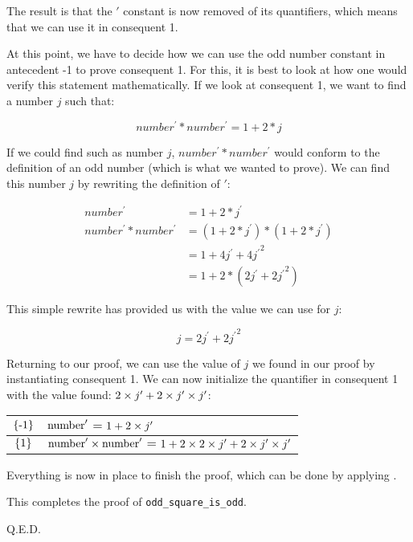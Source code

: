 \vspace{0.1in}

The result is that the {{\('\)}} constant is now removed of its quantifiers, which means that we can use it in consequent 1.\emptyline

At this point, we have to decide how we can use the odd number constant in antecedent -1 to prove consequent 1. For this, it is best to look at how one would verify this statement mathematically. If we look at consequent 1, we want to find a number $j$ such that:

\begin{equation}
number^\prime * number^\prime = 1 + 2 * j
\end{equation}

If we could find such as number $j$, $number^\prime * number^\prime$ would conform to the definition of an odd number (which is what we wanted to prove). We can find this number $j$ by rewriting the definition of {{\('\)}}:

\begin{equation}
\begin{split}
number^\prime & = 1 + 2 * j^\prime\\
number^\prime * number^\prime & = (1 + 2 * j^\prime) * (1 + 2 * j^\prime)\\
                & = 1 + 4j^\prime + {4j^\prime}^2\\
                & = 1 + 2 * (2j^\prime + {2j^\prime}^2)
\end{split}
\end{equation}

This simple rewrite has provided us with the value we can use for $j$:

\begin{equation}
j = 2j^\prime + {2j^\prime}^2
\end{equation}

Returning to our proof, we can use the value of $j$ we found in our proof by instantiating consequent 1. We can now initialize the quantifier in consequent 1 with the value found: \({{2\times j'}+{{2\times j'}\times j'}}\):\emptyline

\begin{tabular}{|cl}
$\{\mbox{\rm -1}\}$ &\begin{minipage}[t]{5.5in}{\begin{alltt}\(\pvsid{number}'\) \(=\) \(\opplustwofn{1}{\optimestwofn{2}{j'}}\)\end{alltt}}\end{minipage}\\\hline
$\{\mbox{\rm 1}\}$ &\begin{minipage}[t]{5.5in}{\begin{alltt}\(\optimestwofn{\pvsid{number}'}{\pvsid{number}'}\) \(=\) \(\opplustwofn{1}{\optimestwofn{2}{\opplustwofn{\optimestwofn{2}{j'}}{\optimestwofn{\optimestwofn{2}{j'}}{j'}}}}\)\end{alltt}}\end{minipage}\\
\end{tabular}

\vspace{0.1in}

Everything is now in place to finish the proof, which can be done by applying .\emptyline

This completes the proof of {\tt odd\_square\_is\_odd}.\emptyline

Q.E.D.